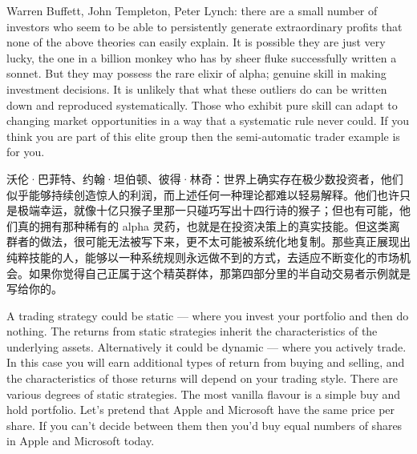 
\begin{englishblock} Warren Buffett, John Templeton, Peter Lynch: there are a small number of investors who seem to be able to persistently generate extraordinary profits that none of the above theories can easily explain. It is possible they are just very lucky, the one in a billion monkey who has by sheer fluke successfully written a sonnet. But they may possess the rare elixir of alpha; genuine skill in making investment decisions. It is unlikely that what these outliers do can be written down and reproduced systematically. Those who exhibit pure skill can adapt to changing market opportunities in a way that a systematic rule never could. If you think you are part of this elite group then the semi-automatic trader example is for you. \end{englishblock}

\begin{chineseblock}沃伦·巴菲特、约翰·坦伯顿、彼得·林奇：世界上确实存在极少数投资者，他们似乎能够持续创造惊人的利润，而上述任何一种理论都难以轻易解释。他们也许只是极端幸运，就像十亿只猴子里那一只碰巧写出十四行诗的猴子；但也有可能，他们真的拥有那种稀有的 alpha 灵药，也就是在投资决策上的真实技能。但这类离群者的做法，很可能无法被写下来，更不太可能被系统化地复制。那些真正展现出纯粹技能的人，能够以一种系统规则永远做不到的方式，去适应不断变化的市场机会。如果你觉得自己正属于这个精英群体，那第四部分里的半自动交易者示例就是写给你的。\end{chineseblock}




\begin{englishblock} A trading strategy could be static --- where you invest your portfolio and then do nothing. The returns from static strategies inherit the characteristics of the underlying assets. Alternatively it could be dynamic --- where you actively trade. In this case you will earn additional types of return from buying and selling, and the characteristics of those returns will depend on your trading style. There are various degrees of static strategies. The most vanilla flavour is a simple buy and hold portfolio. Let's pretend that Apple and Microsoft have the same price per share. If you can't decide between them then you'd buy equal numbers of shares in Apple and Microsoft today. \end{englishblock}

